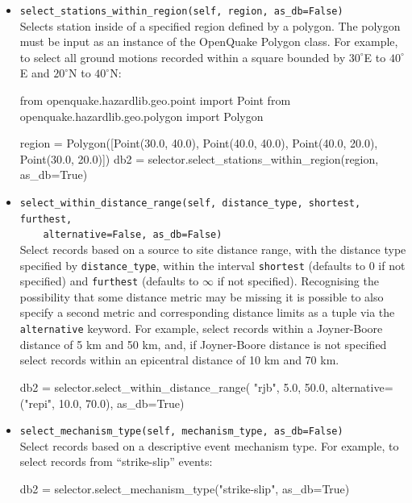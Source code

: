 \begin{itemize}
\item \verb;select_stations_within_region(self, region, as_db=False);\\

Selects station inside of a specified region defined by a polygon. The polygon must be input as an instance of the OpenQuake Polygon class. For example, to select all ground motions recorded within a square bounded by $30^{\circ}$E to $40^{\circ}$E and $20^{\circ}$N to $40^{\circ}$N:

\begin{python}
from openquake.hazardlib.geo.point import Point
from openquake.hazardlib.geo.polygon import Polygon

region = Polygon([Point(30.0, 40.0),
                  Point(40.0, 40.0),
                  Point(40.0, 20.0),
                  Point(30.0, 20.0)])
db2 = selector.select_stations_within_region(region,
                                             as_db=True)
\end{python}

\item \verb;select_within_distance_range(self, distance_type, shortest, furthest,;\\
\verb;    alternative=False, as_db=False);\\
Select records based on a source to site distance range, with the distance type specified by \verb=distance_type=, within the interval \verb=shortest= (defaults to 0 if not specified) and \verb=furthest= (defaults to $\infty$ if not specified). Recognising the possibility that some distance metric may be missing it is possible to also specify a second metric and corresponding distance limits as a tuple via the
\verb=alternative= keyword. For example, select records within a Joyner-Boore distance of 5 km and 50 km, and, if Joyner-Boore distance is not specified select records within an epicentral distance of 10 km and 70 km.

\begin{python}
db2 = selector.select_within_distance_range(
    "rjb", 5.0, 50.0,
    alternative=("repi", 10.0, 70.0),
    as_db=True) 
\end{python}

\item \verb;select_mechanism_type(self, mechanism_type, as_db=False);\\
Select records based on a descriptive event mechanism type. For example, to select records from ``strike-slip'' events:

\begin{python}
db2 = selector.select_mechanism_type("strike-slip",
                                     as_db=True) 
\end{python}


\end{itemize}
